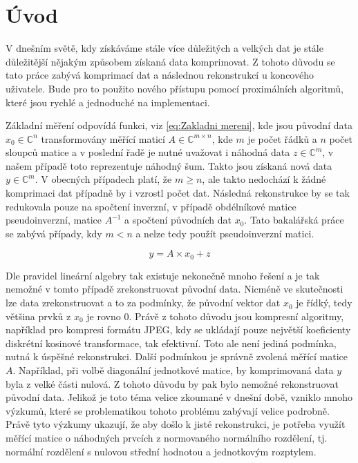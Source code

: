 \documentclass[FM,BP]{tulthesis}
\newcounter{Vzorce}
\begin{document}
\pagebreak

\renewcommand{\baselinestretch}{1.50}
\setlength\parindent{1.2cm}
\selectfont

\chapter{Úvod}
\label{ch:uvod}
 V dnešním světě, kdy získáváme stále více důležitých a velkých dat je stále důležitější nějakým způsobem získaná data komprimovat. Z tohoto důvodu se tato práce zabývá komprimací dat a následnou rekonstrukcí u koncového uživatele. Bude pro to použito nového přístupu pomocí proximálních algoritmů, které jsou rychlé a jednoduché na implementaci.

Základní měření odpovídá funkci, viz \ref{eq:Zakladni mereni}, kde jsou původní data $x_0 \in \mathbb{C}^n$ transformovány měřící maticí $A \in \mathbb{C} ^{m \times n}$, kde $m$ je počet řádků a $n$ počet sloupců matice a v poslední řadě je nutné uvažovat i náhodná data $z \in \mathbb{C}^m$, v našem případě toto reprezentuje náhodný šum. Takto jsou získaná nová data $y \in \mathbb{C}^m$. V obecných případech platí, že $m \geq n$, ale takto nedochází k žádné komprimaci dat případně by i vzrostl počet dat. Následná rekonstrukce by se tak redukovala pouze na spočtení inverzní, v případě obdélníkové matice pseudoinverzní, matice $A^{-1}$ a spočtení původních dat $x_0$. Tato bakalářská práce se zabývá případy, kdy $m < n$ a nelze tedy použít pseudoinverzní matici.

\begin{equation} \label{eq:Zakladni mereni} \tag{Vzorec \theVzorce}
y = A \times x_0 + z
\end{equation}

Dle pravidel lineární algebry tak existuje nekonečně mnoho řešení a je tak nemožné v tomto případě zrekonstruovat původní data. Nicméně ve skutečnosti lze data zrekonstruovat a to za podmínky, že původní vektor dat $x_0$ je řídký, tedy většina prvků z $x_0$ je rovno $0$. Právě z tohoto důvodu jsou kompresní algoritmy, například pro kompresi formátu JPEG, kdy se ukládají pouze největší koeficienty diskrétní kosinové transformace, tak efektivní. Toto ale není jediná podmínka, nutná k úspěšné rekonstrukci. Další podmínkou je správně zvolená měřící matice $A$. Například, při volbě diagonální jednotkové matice, by komprimovaná data $y$ byla z velké části nulová. Z tohoto důvodu by pak bylo nemožné rekonstruovat původní data. Jelikož je toto téma velice zkoumané v dnešní době, vzniklo mnoho výzkumů, které se problematikou tohoto problému zabývají velice podrobně. Právě tyto výzkumy ukazují, že aby došlo k jisté rekonstrukci, je potřeba využít měřící matice o náhodných prvcích z normovaného normálního rozdělení, tj. normální rozdělení s nulovou střední hodnotou a jednotkovým rozptylem.
\end{document}
